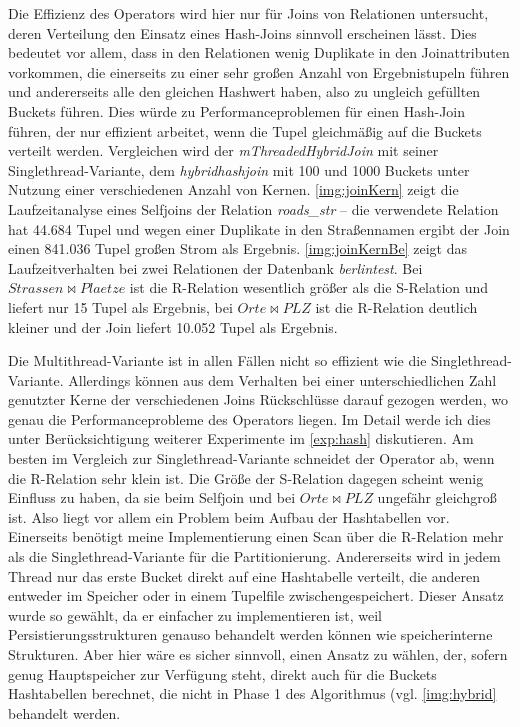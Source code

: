 \documentclass[a4paper,12pt,twoside]{article}
\newcommand{\Fb}[1]{\textit{#1}} %
\begin{document}
Die Effizienz des Operators wird hier nur für Joins von Relationen untersucht, deren Verteilung den Einsatz eines Hash-Joins sinnvoll erscheinen lässt. Dies bedeutet vor allem, dass in den Relationen wenig Duplikate in den Joinattributen vorkommen, die einerseits zu einer sehr großen Anzahl von Ergebnistupeln führen und andererseits alle den gleichen Hashwert haben, also zu ungleich gefüllten Buckets führen. Dies würde zu Performanceproblemen für einen Hash-Join führen, der nur effizient arbeitet, wenn die Tupel gleichmäßig auf die Buckets verteilt werden. Vergleichen wird der \Fb{mThreadedHybridJoin} mit seiner Singlethread-Variante, dem \Fb{hybridhashjoin} mit 100 und 1000 Buckets unter Nutzung einer verschiedenen Anzahl von Kernen. \autoref{img:joinKern} zeigt die Laufzeitanalyse eines Selfjoins der Relation \Fb{roads\_str} -- die verwendete Relation hat 44.684 Tupel und wegen einer Duplikate in den Straßennamen ergibt der Join einen 841.036 Tupel großen Strom als Ergebnis. \autoref{img:joinKernBe} zeigt das Laufzeitverhalten bei zwei Relationen der Datenbank \Fb{berlintest}. Bei $Strassen \bowtie Plaetze$ ist die R-Relation wesentlich größer als die S-Relation und liefert nur 15 Tupel als Ergebnis, bei $Orte \bowtie PLZ$ ist die R-Relation deutlich kleiner und der Join liefert 10.052 Tupel als Ergebnis.

Die Multithread-Variante ist in allen Fällen nicht so effizient wie die Singlethread-Variante. Allerdings können aus dem Verhalten bei einer unterschiedlichen Zahl genutzter Kerne der verschiedenen Joins Rückschlüsse darauf gezogen werden, wo genau die Performanceprobleme des Operators liegen. Im Detail werde ich dies unter Berücksichtigung weiterer Experimente im \autoref{exp:hash} diskutieren. Am besten im Vergleich zur Singlethread-Variante schneidet der Operator ab, wenn die R-Relation sehr klein ist. Die Größe der S-Relation dagegen scheint wenig Einfluss zu haben, da sie beim Selfjoin und bei $Orte \bowtie PLZ$ ungefähr gleichgroß ist. Also liegt vor allem ein Problem beim Aufbau der Hashtabellen vor. Einerseits benötigt meine Implementierung einen Scan über die R-Relation mehr als die Singlethread-Variante für die Partitionierung. Andererseits wird in jedem Thread nur das erste Bucket direkt auf eine Hashtabelle verteilt, die anderen entweder im Speicher oder in einem Tupelfile zwischengespeichert. Dieser Ansatz wurde so gewählt, da er einfacher zu implementieren ist, weil Persistierungsstrukturen genauso behandelt werden können wie speicherinterne Strukturen. Aber hier wäre es sicher sinnvoll, einen Ansatz zu wählen, der, sofern genug Hauptspeicher zur Verfügung steht, direkt auch für die Buckets Hashtabellen berechnet, die nicht in Phase 1 des Algorithmus (vgl. \autoref{img:hybrid} behandelt werden. 
\end{document}
